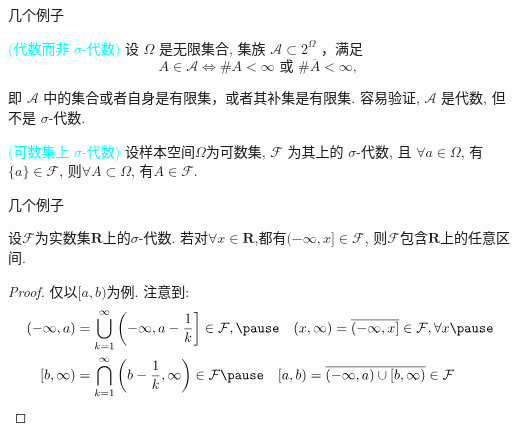 \documentclass[Prob-All.tex]{subfiles}
\begin{document}
\begin{frame}{几个例子}
	\begin{exam}\textcolor{cyan}{(代数而非 ${\sigma}$-代数)} 设 ${\Omega}$ 是无限集合, 集族 ${\mathcal{A} \subset 2^{\Omega}}$ ，满足
		\[
		A \in \mathcal{A} \Longleftrightarrow \# A<\infty \text { 或  }  \# \overline{A}<\infty \text {, }
		\]

		即 ${\mathcal{A}}$ 中的集合或者自身是有限集，或者其补集是有限集.
		容易验证, ${\mathcal{A}}$ 是代数, 但不是 ${\sigma}$-代数.
	\end{exam}
\pause
\vspace{0.5cm}
\begin{exam}
	\textcolor{cyan}{(可数集上 ${\sigma}$-代数)} 设样本空间${\Omega}$为可数集, ${\mathcal{F}}$ 为其上的 ${\sigma}$-代数, 且 ${\forall a \in \Omega}$, 有 ${\{a\} \in \mathcal{F}}$, 则${\forall A \subset \Omega}$, 有${A \in \mathcal{F}}$.
\end{exam}





\end{frame}

\begin{frame}{几个例子}
	\begin{exam}设${\mathcal{F}}$为实数集${\mathbf{R}}$上的${\sigma}$-代数. 若对${\forall x\in\mathbf{R}}$,都有${(-\infty,x]\in\mathcal{F}}$, 则${\mathcal{F}}$包含${\mathbf{R}}$上的任意区间.
\end{exam}
\pause

\vspace{0.1cm}

\begin{proof}
	仅以${[a,b)}$为例. 注意到:%
	\begin{align*}
		(-\infty, a)&=\bigcup_{k=1}^{\infty}\left(-\infty, a-\frac{1}{k}\right] \in \mathcal{F},  \pause \quad (x, \infty)=\overline{(-\infty, x]} \in \mathcal{F},  \forall x \pause \\
		[b, \infty)&=\bigcap_{k=1}^{\infty}\left(b-\frac{1}{k}, \infty\right) \in \mathcal{F}  \pause \quad	 	[a, b)=\overline{(-\infty, a) \cup [b, \infty)} \in \mathcal{F}
	\end{align*}


\end{proof}


\end{frame}
\end{document}
